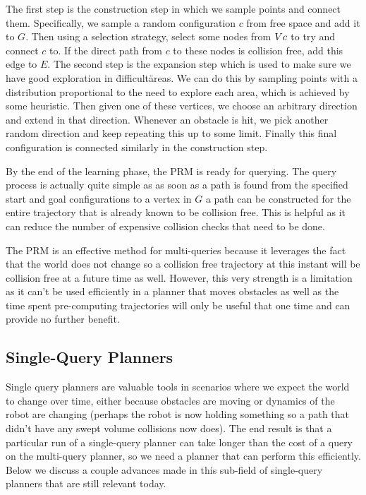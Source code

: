The first step is the construction step in which we sample points and connect them. Specifically, we sample a random configuration $c$ from free space and add it to $G$. Then using a selection strategy, select some nodes from $V\\c$ to try and connect $c$ to. If the direct path from $c$ to these nodes is collision free, add this edge to $E$. The second step is the expansion step which is used to make sure we have good exploration in \"difficult\" areas. We can do this by sampling points with a distribution proportional to the need to explore each area, which is achieved by some heuristic. Then given one of these vertices, we choose an arbitrary direction and extend in that direction. Whenever an obstacle is hit, we pick another random direction and keep repeating this up to some limit. Finally this final configuration is connected similarly in the construction step. 

By the end of the learning phase, the PRM is ready for querying. The query process is actually quite simple as as soon as a path is found from the specified start and goal configurations to a vertex in $G$ a path can be constructed for the entire trajectory that is already known to be collision free. This is helpful as it can reduce the number of expensive collision checks that need to be done. 

The PRM is an effective method for multi-queries because it leverages the fact that the world does not change so a collision free trajectory at this instant will be collision free at a future time as well. However, this very strength is a limitation as it can't be used efficiently in a planner that moves obstacles as well as the time spent pre-computing trajectories will only be useful that one time and can provide no further benefit.

\subsection{Single-Query Planners}
Single query planners are valuable tools in scenarios where we expect the world to change over time, either because obstacles are moving or dynamics of the robot are changing (perhaps the robot is now holding something so a path that didn't have any swept volume collisions now does). The end result is that a particular run of a single-query planner can take longer than the cost of a query on the multi-query planner, so we need a planner that can perform this efficiently. Below we discuss a couple advances made in this sub-field of single-query planners that are still relevant today.


